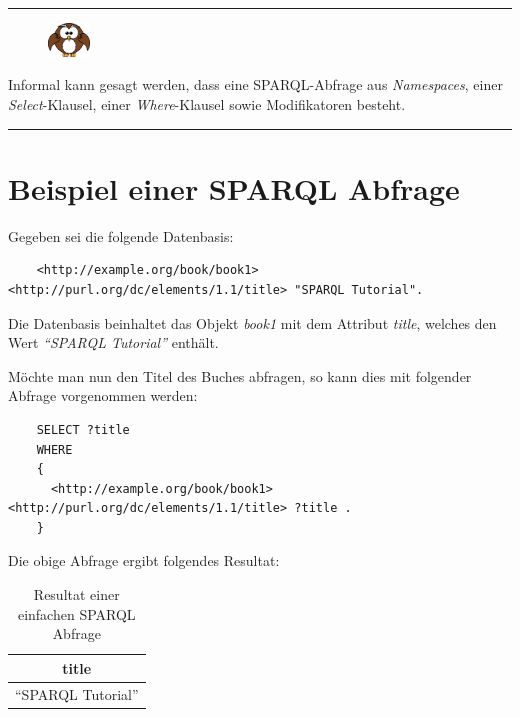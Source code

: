 \noindent\rule[1ex]{\textwidth}{1pt}
\begin{figure}
    \vspace{-21pt}
    \includegraphics[width=0.1\textwidth]{bilder/owl.png}
\end{figure}
Informal kann gesagt werden, dass eine SPARQL-Abfrage aus \textit{Namespaces}, einer \textit{Select}-Klausel, einer \textit{Where}-Klausel sowie Modifikatoren besteht.

\noindent\rule[1ex]{\textwidth}{1pt}

\section{Beispiel einer SPARQL Abfrage}
\label{sec:sparql_beispiel}

Gegeben sei die folgende Datenbasis:
\lstset{language=XML}
\begin{lstlisting}
    <http://example.org/book/book1> <http://purl.org/dc/elements/1.1/title> "SPARQL Tutorial".
\end{lstlisting}

Die Datenbasis beinhaltet das Objekt \textit{book1} mit dem Attribut \textit{title}, welches den Wert \textit{``SPARQL Tutorial''} enthält.

Möchte man nun den Titel des Buches abfragen, so kann dies mit folgender Abfrage vorgenommen werden:
\begin{lstlisting}
    SELECT ?title
    WHERE
    {
      <http://example.org/book/book1> <http://purl.org/dc/elements/1.1/title> ?title .
    }
\end{lstlisting}

Die obige Abfrage ergibt folgendes Resultat:
\noindent\hspace*{15mm}
\begin{table}[h]
    \centering
    \begin{tabular}{|l|}
        \hline
        \multicolumn{1}{|c|}{\textbf{title}} \\ \hline
        ``SPARQL Tutorial''                    \\ \hline
    \end{tabular}
    \caption{Resultat einer einfachen SPARQL Abfrage\protect\footnotemark}
\end{table}

